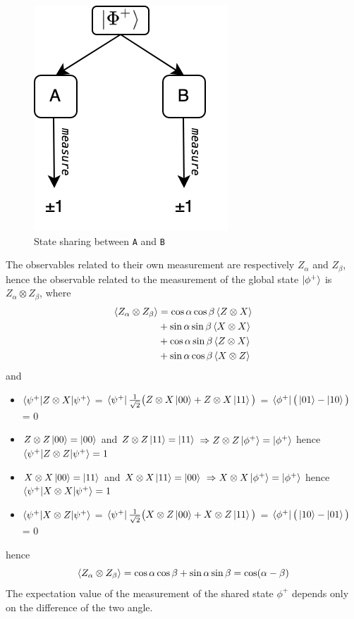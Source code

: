 \documentclass{article}
\begin{document}
\begin{figure}[h]
    \centering
    \includegraphics[scale=0.4]{bell-ineq-sharing-scheme.png}
    \caption{State sharing between \texttt{A} and \texttt{B}}
    \label{fig:sharing-scheme}
\end{figure}
\noindent
The observables related to their own measurement are respectively $Z_\alpha$ and
$Z_\beta$, hence the observable related to the measurement of the global state
$\ket{\phi^+}$ is $Z_\alpha \otimes Z_\beta$, where
\begin{equation}
    \begin{aligned}
        \braket{Z_\alpha \otimes Z_\beta}
            &= \cos \alpha \cos \beta \braket{Z \otimes X} \\
            &+ \sin \alpha \sin \beta \braket{X \otimes X} \\
            &+ \cos \alpha \sin \beta \braket{Z \otimes X} \\
            &+ \sin \alpha \cos \beta \braket{X \otimes Z}
    \end{aligned}
\end{equation}
and
\begin{itemize}[label=-]
    \item $\braket{\psi^+|Z \otimes X|\psi^+}$ = $\bra{\psi^+}
        \frac{1}{\sqrt2}\big(Z \otimes X\ket{00} + Z \otimes X\ket{11}\big)$ =
        $\bra{\phi^+}\big(\ket{01}-\ket{10}\big)$ = 0
    \item $Z \otimes Z \ket{00} = \ket{00}$ and $Z \otimes Z \ket{11} =
        \ket{11}$ $\Rightarrow Z \otimes Z \ket{\phi^+} = \ket{\phi^+}$ hence
        $\braket{\psi^+|Z \otimes Z|\psi^+} = 1$
    \item $X \otimes X \ket{00} = \ket{11}$ and $X \otimes X \ket{11} =
    \ket{00}$ $\Rightarrow X \otimes X \ket{\phi^+} = \ket{\phi^+}$ hence
    $\braket{\psi^+|X \otimes X|\psi^+} = 1$
    \item $\braket{\psi^+|X \otimes Z|\psi^+}$ = $\bra{\psi^+}
    \frac{1}{\sqrt2}\big(X \otimes Z\ket{00} + X \otimes Z\ket{11}\big)$ =
    $\bra{\phi^+}\big(\ket{10}-\ket{01}\big)$ = 0
\end{itemize}
hence
\begin{equation}
    \braket{Z_\alpha \otimes Z_\beta} =
        \cos \alpha \cos \beta + \sin \alpha \sin \beta = \cos(\alpha - \beta)
\end{equation}
The expectation value of the measurement of the shared state $\phi^+$ depends
only on the difference of the two angle.
\end{document}
